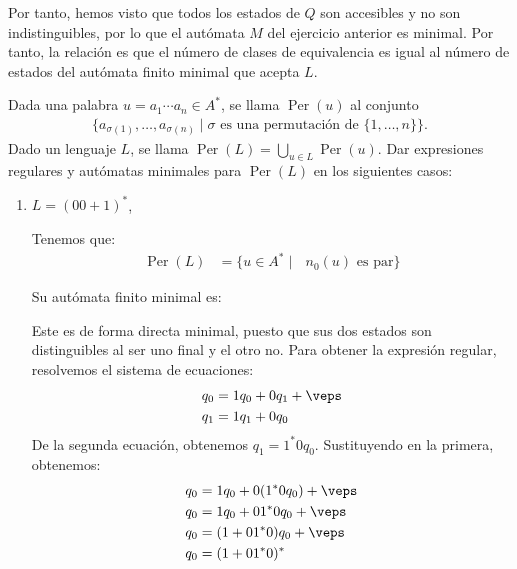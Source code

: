 \begin{ejercicio}
\begin{enumerate}
        Por tanto, hemos visto que todos los estados de $Q$ son accesibles y no son indistinguibles, por lo que el autómata $M$ del ejercicio anterior es minimal. Por tanto, la relación es que el número de clases de equivalencia es igual al número de estados del autómata finito minimal que acepta $L$.
    \end{enumerate}
\end{ejercicio}

\begin{ejercicio}
    Dada una palabra $u = a_1 \cdots a_n \in A^*$, se llama $\operatorname{Per}(u)$ al conjunto
    \begin{align*}
        \{a_{\sigma(1)}, \ldots, a_{\sigma(n)} \mid \sigma \text{\ es una permutación de\ } \{1, \ldots, n\}\}.
    \end{align*}
    Dado un lenguaje $L$, se llama $\operatorname{Per}(L) = \bigcup\limits_{u \in L} \operatorname{Per}(u)$.
    Dar expresiones regulares y autómatas minimales para $\operatorname{Per}(L)$ en los siguientes casos:
    \begin{enumerate}%
        \item $L = (00 + 1)^*$,
        
        Tenemos que:
        \begin{align*}
            \operatorname{Per}(L) &= \{u\in A^*\mid \text{\ $n_0(u)$ es par}\}
        \end{align*}

        Su autómata finito minimal es:
        \begin{figure}[H]
            \centering
        \end{figure}
        
        Este es de forma directa minimal, puesto que sus dos estados son distinguibles al ser uno final y el otro no. Para obtener la expresión regular, resolvemos el sistema de ecuaciones:
        \begin{align*}
            q_0 &= 1q_0 + 0q_1 + \veps\\
            q_1 &= 1q_1 + 0q_0
        \end{align*}
        De la segunda ecuación, obtenemos $q_1=1^*0q_0$. Sustituyendo en la primera, obtenemos:
        \begin{align*}
            q_0 &= 1q_0 + 0(1^*0q_0) + \veps\\
            q_0 &= 1q_0 + 01^*0q_0 + \veps\\
            q_0 &= (1+01^*0)q_0 + \veps\\
            q_0 &= (1+01^*0)^*
        \end{align*}


\end{enumerate}
\end{ejercicio}
